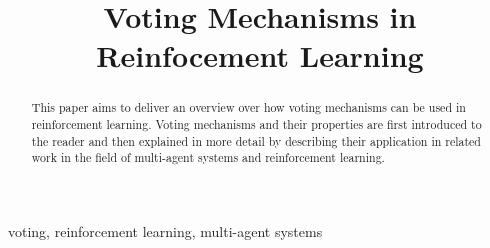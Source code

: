 \documentclass[conference]{IEEEtran}
\begin{document}
\title{Voting Mechanisms in Reinfocement Learning}

\author{
}

\maketitle


\begin{abstract}
This paper aims to deliver an overview over how voting mechanisms can be used in reinforcement learning.
Voting mechanisms and their properties are first introduced to the reader and then explained in more detail by describing their application in related work in the field of multi-agent systems and reinforcement learning.
\end{abstract}

\begin{IEEEkeywords}
voting, reinforcement learning, multi-agent systems
\end{IEEEkeywords}

\end{document}
